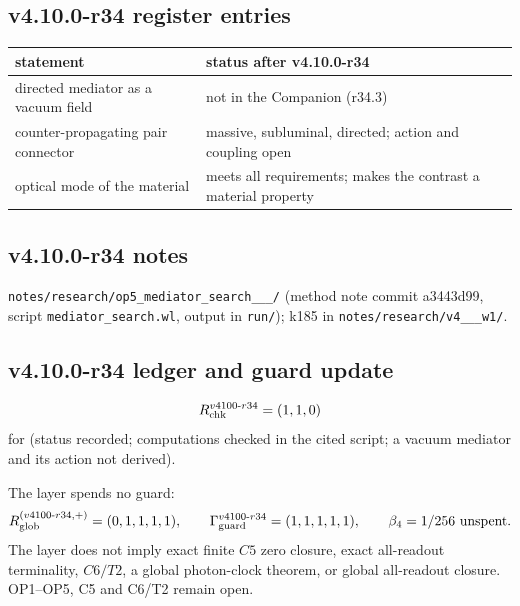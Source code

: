 \subsection*{v4.10.0-r34 register entries}
\label{subsec:v4100-r34-register}

\begin{center}
\small
\begin{tabular}{@{}>{\raggedright\arraybackslash}p{}>{\raggedright\arraybackslash}p{}@{}}
\toprule
statement & status after v4.10.0-r34\\
\midrule
directed mediator as a vacuum field & not in the Companion (r34.3)\\
counter-propagating pair connector & massive, subluminal, directed; action and coupling open\\
optical mode of the material & meets all requirements; makes the contrast a material property\\
\bottomrule
\end{tabular}
\end{center}

\subsection*{v4.10.0-r34 notes}
\label{subsec:v4100-r34-notes}

\texttt{notes/\allowbreak research/\allowbreak op5\_\allowbreak mediator\_\allowbreak search\_\_\_/} (method note commit a3443d99,
script \texttt{mediator\_\allowbreak search.wl}, output in \texttt{run/}); k185 in \texttt{notes/\allowbreak research/\allowbreak v4\_\_\_\allowbreak w1/}.

\subsection*{v4.10.0-r34 ledger and guard update}
\label{subsec:v4100-r34-ledger-guard}

\[
R_{\rm chk}^{v4100\text{-}r34}=(1,1,0)
\]
for (status recorded; computations checked in the cited script; a vacuum mediator and its action not derived).

The layer spends no guard:
\[
R_{\rm glob}^{(v4100\text{-}r34,+)}=(0,1,1,1,1),
\qquad
\Gamma_{\rm guard}^{v4100\text{-}r34}=(1,1,1,1,1),
\qquad
\beta_4=1/256\ \text{unspent}.
\]
The layer does not imply exact finite \(C5\) zero closure, exact all-readout terminality, \(C6/T2\), a global photon-clock theorem,
or global all-readout closure.  OP1--OP5, C5 and C6/T2 remain open.

